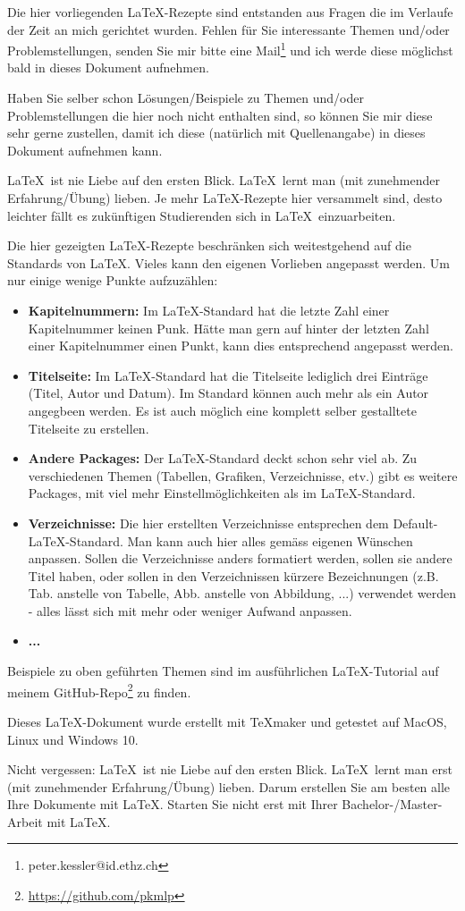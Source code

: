 
Die hier vorliegenden \LaTeX-Rezepte sind entstanden aus Fragen die im Verlaufe der Zeit an mich gerichtet wurden. Fehlen für Sie interessante Themen und/oder Problemstellungen, senden Sie mir bitte eine Mail\footnote{peter.kessler@id.ethz.ch} und ich werde diese möglichst bald in dieses Dokument aufnehmen.

Haben Sie selber schon Lösungen/Beispiele zu Themen und/oder Problemstellungen die hier noch nicht enthalten sind, so können Sie mir diese sehr gerne zustellen, damit ich diese (natürlich mit Quellenangabe) in dieses Dokument aufnehmen kann.

\LaTeX\ ist nie Liebe auf den ersten Blick. \LaTeX\ lernt man (mit zunehmender Erfahrung/Übung) lieben. Je mehr \LaTeX-Rezepte hier versammelt sind, desto leichter fällt es zukünftigen Studierenden sich in \LaTeX\ einzuarbeiten.

Die hier gezeigten \LaTeX-Rezepte beschränken sich weitestgehend auf die Standards von \LaTeX. Vieles kann den eigenen Vorlieben angepasst werden. Um nur einige wenige Punkte aufzuzählen:

\begin{itemize}
\setlength\itemsep{-1em}
\item \textbf{Kapitelnummern:} Im \LaTeX-Standard hat die letzte Zahl einer Kapitelnummer keinen Punk. Hätte man gern auf hinter der letzten Zahl einer Kapitelnummer einen Punkt, kann dies entsprechend angepasst werden.  
\item \textbf{Titelseite:} Im \LaTeX-Standard hat die Titelseite lediglich drei Einträge (Titel, Autor und Datum). Im Standard können auch mehr als ein Autor angegbeen werden. Es ist auch möglich eine komplett selber gestalltete Titelseite zu erstellen. 
\item \textbf{Andere Packages:} Der \LaTeX-Standard deckt schon sehr viel ab. Zu verschiedenen Themen (Tabellen, Grafiken, Verzeichnisse, etv.) gibt es weitere Packages, mit viel mehr Einstellmöglichkeiten als im \LaTeX-Standard.  
\item \textbf{Verzeichnisse:} Die hier erstellten Verzeichnisse entsprechen dem Default-\LaTeX-Standard. Man kann auch hier alles gemäss eigenen Wünschen anpassen. Sollen die Verzeichnisse anders formatiert werden, sollen sie andere Titel haben, oder sollen in den Verzeichnissen kürzere Bezeichnungen (z.B. Tab. anstelle von Tabelle, Abb. anstelle von Abbildung, ...) verwendet werden - alles lässt sich mit mehr oder weniger Aufwand anpassen.
\item \textbf{...}
\end{itemize}

Beispiele zu oben geführten Themen sind im ausführlichen \LaTeX-Tutorial auf meinem GitHub-Repo\footnote{\url{https://github.com/pkmlp}}  zu finden. 

Dieses \LaTeX-Dokument wurde erstellt mit TeXmaker und getestet auf MacOS, Linux und Windows 10.

Nicht vergessen: \LaTeX\ ist nie Liebe auf den ersten Blick. \LaTeX\ lernt man erst (mit zunehmender Erfahrung/Übung) lieben. Darum erstellen Sie am besten alle Ihre Dokumente mit \LaTeX. Starten Sie nicht erst mit Ihrer Bachelor-/Master-Arbeit mit \LaTeX.
